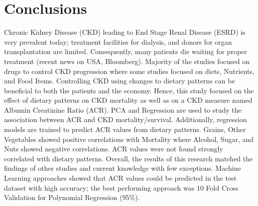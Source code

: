 \section{Conclusions}

Chronic Kidney Disease (CKD) leading to End Stage Renal Disease (ESRD) is very prevalent today; treatment facilities for dialysis, and donors for organ transplantation are limited. Consequently, many patients die waiting for  proper treatment (recent news on USA, Bloomberg). Majority of the studies focused on drugs to control CKD progression where some studies focused on diets, Nutrients, and Food Items. Controlling CKD using changes to dietary patterns can be beneficial to both the patients and the economy. Hence, this study focused on the effect of dietary patterns on CKD mortality as well as on a CKD measure named Albumin Creatinine Ratio (ACR). PCA and Regression are used to study the association between ACR and CKD mortality/survival. Additionally, regression models are trained to predict ACR values from dietary patterns. Grains, Other Vegetables showed positive correlations with Mortality where Alcohol, Sugar, and Nuts showed negative correlations. ACR values were not found strongly correlated with dietary patterns. Overall, the results of this research matched the findings of other studies and current knowledge with few exceptions. Machine Learning approaches showed that ACR values could be predicted in the test dataset with high accuracy; the best performing approach was 10 Fold Cross Validation for Polynomial Regression (95\%).